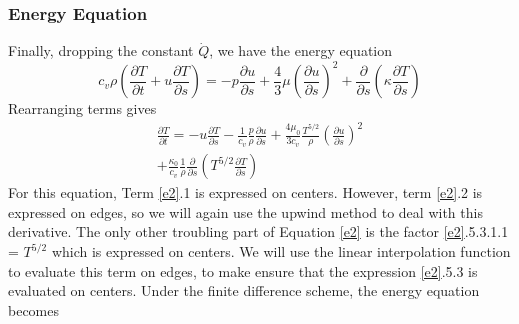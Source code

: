 \documentclass[iop]{emulateapj}
\begin{document}
				\subsubsection{Energy Equation}
				
					Finally, dropping the constant $\dot{Q}$, we have the energy equation
					\begin{equation}
						c_v \rho \left( \frac{\partial T}{\partial t} + u  \frac{\partial T}{\partial s} \right) = -p \frac{\partial u}{\partial s} + \frac{4}{3} \mu \left( \frac{\partial u}{\partial s} \right)^2 + \frac{\partial}{\partial s} \left( \kappa \frac{\partial T}{\partial s} \right) \nonumber
					\end{equation}
					Rearranging terms gives
					\begin{equation}
						\begin{split}
						\frac{\partial T}{\partial t} = -u \frac{\partial T}{\partial s} - \frac{1}{c_v} \frac{p}{\rho} \frac{\partial u}{\partial s} + \frac{4 \mu_0}{3 c_v} \frac{T^{5/2}}{\rho} \left(\frac{\partial u}{\partial s}\right)^2 \\ + \frac{\kappa_0}{c_v} \frac{1}{\rho} \frac{\partial}{\partial s} \left( T^{5/2} \frac{\partial T}{\partial s} \right) 
						\end{split}
						\label{e2}
					\end{equation}
					For this equation, Term \ref{e2}.1 is expressed on centers. However, term \ref{e2}.2 is expressed on edges, so we will again use the upwind method to deal with this derivative. The only other troubling part of Equation \ref{e2} is the factor \ref{e2}.5.3.1.1 = $T^{5/2}$ which is expressed on centers. We will use the linear interpolation function to evaluate this term on edges, to make ensure that the expression \ref{e2}.5.3 is evaluated on centers. Under the finite difference scheme, the energy equation becomes
\end{document}
